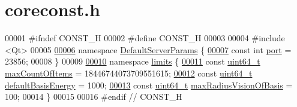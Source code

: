 \hypertarget{a00020_source}{}\section{coreconst.\+h}
\label{a00020_source}

\begin{DoxyCode}
00001 \textcolor{preprocessor}{#}\textcolor{preprocessor}{ifndef} \textcolor{preprocessor}{CONST\_H}
00002 \textcolor{preprocessor}{#}\textcolor{preprocessor}{define} \textcolor{preprocessor}{CONST\_H}
00003 
00004 \textcolor{preprocessor}{#}\textcolor{preprocessor}{include} \textcolor{preprocessor}{<}\textcolor{preprocessor}{Qt}\textcolor{preprocessor}{>}
00005 
\hyperlink{a00114}{00006} \textcolor{keyword}{namespace} \hyperlink{a00114}{DefaultServerParams} \{
\hyperlink{a00114_a7ac0709dc92e311b3524c365a2a05d96}{00007} \textcolor{keyword}{const} \textcolor{keywordtype}{int} \hyperlink{a00114_a7ac0709dc92e311b3524c365a2a05d96}{port} = 23856;
00008 \}
00009 
\hyperlink{a00115}{00010} \textcolor{keyword}{namespace} \hyperlink{a00115}{limits} \{
\hyperlink{a00115_a1fe7215d57cdf80c6fbd71a16853dcd2}{00011} \textcolor{keyword}{const} \hyperlink{a00115_a1fe7215d57cdf80c6fbd71a16853dcd2}{uint64\_t} \hyperlink{a00115_a1fe7215d57cdf80c6fbd71a16853dcd2}{maxCountOfItems} = 18446744073709551615;
\hyperlink{a00115_a5ece0bc57b69f35c537f34cc06b620f5}{00012} \textcolor{keyword}{const} \hyperlink{a00115_a5ece0bc57b69f35c537f34cc06b620f5}{uint64\_t} \hyperlink{a00115_a5ece0bc57b69f35c537f34cc06b620f5}{defaultBasisEnergy} = 1000;
\hyperlink{a00115_aa57018b6545bade5e6f69133071a1342}{00013} \textcolor{keyword}{const} \hyperlink{a00115_aa57018b6545bade5e6f69133071a1342}{uint64\_t} \hyperlink{a00115_aa57018b6545bade5e6f69133071a1342}{maxRadiusVisionOfBasis} = 100;
00014 \}
00015 
00016 \textcolor{preprocessor}{#}\textcolor{preprocessor}{endif}  \textcolor{comment}{// CONST\_H}
\end{DoxyCode}
